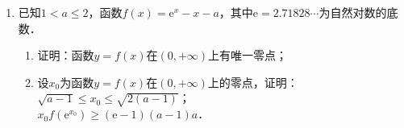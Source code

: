 \begin{description}
\begin{enumerate}[leftmargin=5pt]
\begin{enumerate}[label=(\arabic*)]
        \end{enumerate}
        \item 已知$1<a\leqslant 2$，函数$f(x)=\mathrm{e}^{x}-x-a$，其中$\mathrm{e}=2.71828\cdots$为自然对数的底数．
        \begin{enumerate}[label=(\arabic*)]
            \item 证明：函数$y=f(x)$在$(0,+\infty)$上有唯一零点；
            \item 设$x_{0}$为函数$y=f(x)$在$(0,+\infty)$上的零点，证明：\\
            $\sqrt{a-1}\leqslant x_{0}\leqslant\sqrt{2(a-1)}$；\\
            $x_{0}f(\mathrm{e}^{x_{0}})\geqslant(\mathrm{e}-1)(a-1)a$．
        \end{enumerate}
    \end{enumerate}
\end{description}
\clearpage
